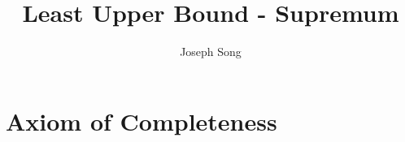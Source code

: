 \documentclass{article}
\title{Least Upper Bound - Supremum}
\author{Joseph Song}
\date{}
\begin{document}
\maketitle

\section{Axiom of Completeness}
\end{document}
